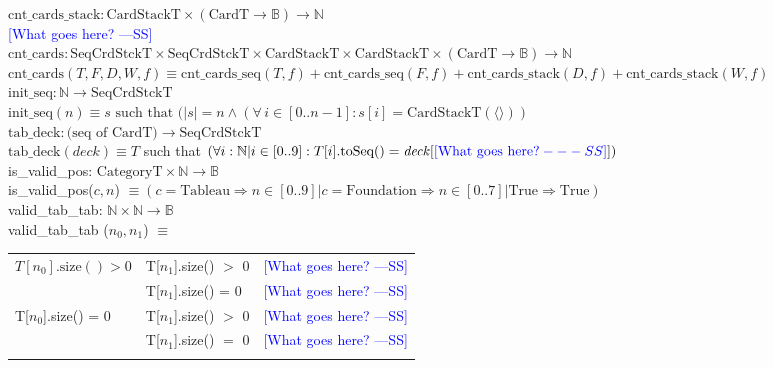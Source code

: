 \documentclass[12pt]{article}
\newcommand{\authornote}[3]{\textcolor{#1}{[#3 ---#2]}}
\newcommand{\authornote}[3]{}
\newcommand{\wss}[1]{\authornote{blue}{SS}{#1}}
\begin{document}
\noindent $\text{cnt\_cards\_stack}: \text{CardStackT} \times (\text{CardT}
\rightarrow \mathbb{B}) \rightarrow \mathbb{N}$\\
\noindent \wss{What goes here?}\\

\noindent $\text{cnt\_cards}: \text{SeqCrdStckT} \times \text{SeqCrdStckT}
\times \text{CardStackT} \times \text{CardStackT} \times (\text{CardT}
\rightarrow \mathbb{B}) \rightarrow \mathbb{N}$\\
\noindent $\text{cnt\_cards}(T, F, D, W, f) \equiv \text{cnt\_cards\_seq}(T,
f) + \text{cnt\_cards\_seq}(F, f) + \text{cnt\_cards\_stack}(D, f) +
\text{cnt\_cards\_stack}(W, f)$\\

\noindent $\text{init\_seq}: \mathbb{N} \rightarrow \text{SeqCrdStckT}$\\
\noindent $\text{init\_seq}(n) \equiv s \text{ such that } (|s| = n \land (\forall\, i
\in [0..n-1] : s[i] = \text{CardStackT}(\langle \rangle))$\\

\noindent $\text{tab\_deck}: \text{(seq of CardT)} \rightarrow \text{SeqCrdStckT}$\\
\noindent $\text{tab\_deck} (\mathit{deck}) \equiv T$ such that
$(\forall i: \mathbb{N} | i \in [0..9] : T[i].\text{toSeq}() =
\mathit{deck}[\wss{\text{What goes here?}}])$\\

\noindent is\_valid\_pos: $ \text{CategoryT} \times \mathbb{N} \rightarrow \mathbb{B}$\\
\noindent is\_valid\_pos($c, n$) $\equiv (c = \text{Tableau} \Rightarrow n \in
[0..9] | c = \text{Foundation} \Rightarrow n \in [0..7] | \text{True} \Rightarrow \text{True})$\\

\noindent valid\_tab\_tab: $\mathbb{N} \times \mathbb{N} \rightarrow \mathbb{B}$\\
\noindent valid\_tab\_tab ($n_0, n_1$) $\equiv$

\begin{tabular}{|p{4cm}|p{3.5cm}|l|}
\hhline{|-|-|-|}
$T[n_0].\text{size}() > 0$ & T[$n_1$].size() $>$ 0 & \wss{What goes here?}\\
\hhline{|~|-|-|}
 & T[$n_1$].size() = 0 & \wss{What goes here?}\\
\hhline{|-|-|-|}
T[$n_0$].size() = 0 & T[$n_1$].size() $>$ 0 & \wss{What goes here?}\\
\hhline{|~|-|-|}
& T[$n_1$].size() $=$ 0 & \wss{What goes here?}\\
\hhline{|-|-|-|}
\end{tabular}\\\\
\end{document}
